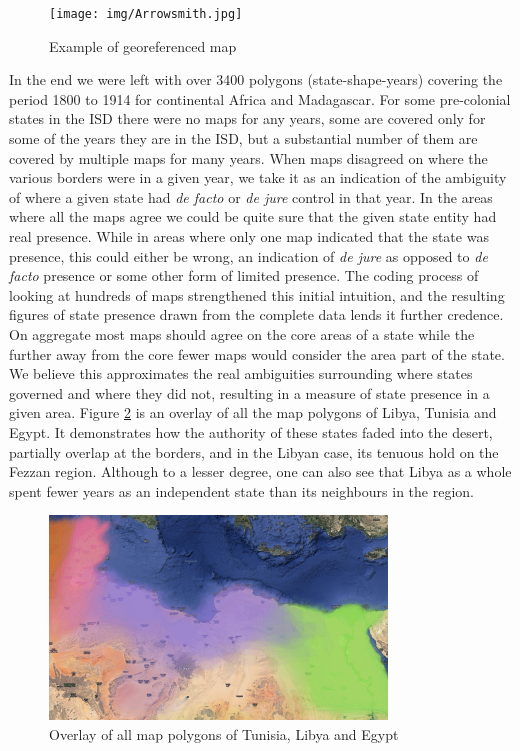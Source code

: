 \documentclass[12pt]{article}
\begin{document}

\begin{figure}[h!tpb]
	\centering
	\texttt{[image: img/Arrowsmith.jpg]}
	\caption{Example of georeferenced map}%
	\label{fig:Arrowsmith}
\end{figure}


In the end we were left with over 3400 polygons (state-shape-years) covering the
period 1800 to 1914 for continental Africa and Madagascar. For some pre-colonial
states in the ISD there were no maps for any years, some are covered only for
some of the years they are in the ISD, but a substantial number of them are
covered by multiple maps for many years. When maps disagreed on where the
various borders were in a given year, we take it as an indication of the
ambiguity of where a given state had \emph{de facto} or \emph{de jure} control
in that year. In the areas where all the maps agree we could be quite sure that
the given state entity had real presence.  While in areas where only one map
indicated that the state was presence, this could either be wrong, an indication
of \emph{de jure} as opposed to \emph{de facto} presence or some other form of
limited presence. The coding process of looking at hundreds of maps strengthened
this initial intuition, and the resulting figures of state presence drawn from
the complete data lends it further credence. On aggregate most maps should agree
on the core areas of a state while the further away from the core fewer maps
would consider the area part of the state. We believe this approximates the real
ambiguities surrounding where states governed and where they did not, resulting
in a measure of state presence in a given area. Figure \ref{overlay} is an
overlay of all the map polygons of Libya, Tunisia and Egypt. It demonstrates how
the authority of these states faded into the desert, partially overlap at the
borders, and in the Libyan case, its tenuous hold on the Fezzan region. Although
to a lesser degree, one can also see that Libya as a whole spent fewer years as
an independent state than its neighbours in the region.


\begin{figure}[htpb]
	\centering
	\includegraphics[width=0.8\textwidth,keepaspectratio]{img/TUNLIBEGY.pdf}
	\caption{Overlay of all map polygons of Tunisia, Libya and Egypt}
	\label{overlay}
\end{figure}
\end{document}

